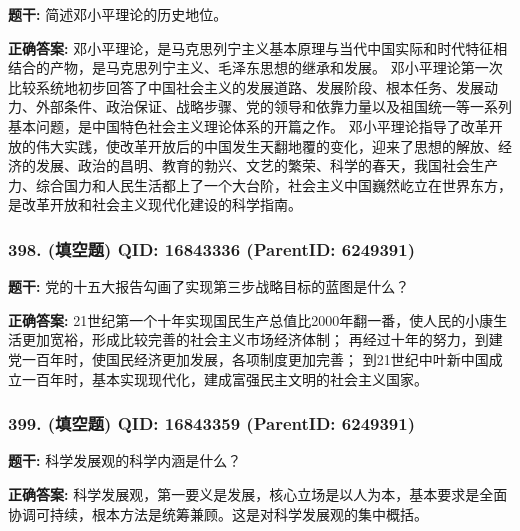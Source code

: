 \documentclass[12pt,UTF8]{ctexart}
\begin{document}
\textbf{题干:}
简述邓小平理论的历史地位。



\textbf{正确答案:}
邓小平理论，是马克思列宁主义基本原理与当代中国实际和时代特征相结合的产物，是马克思列宁主义、毛泽东思想的继承和发展。
邓小平理论第一次比较系统地初步回答了中国社会主义的发展道路、发展阶段、根本任务、发展动力、外部条件、政治保证、战略步骤、党的领导和依靠力量以及祖国统一等一系列基本问题，是中国特色社会主义理论体系的开篇之作。
邓小平理论指导了改革开放的伟大实践，使改革开放后的中国发生天翻地覆的变化，迎来了思想的解放、经济的发展、政治的昌明、教育的勃兴、文艺的繁荣、科学的春天，我国社会生产力、综合国力和人民生活都上了一个大台阶，社会主义中国巍然屹立在世界东方，是改革开放和社会主义现代化建设的科学指南。

\vspace{0.3em}\hrulefill\vspace{0.7em}

\subsubsection*{398. (填空题) \small QID: 16843336 (ParentID: 6249391)}

\textbf{题干:}
党的十五大报告勾画了实现第三步战略目标的蓝图是什么？



\textbf{正确答案:}
21世纪第一个十年实现国民生产总值比2000年翻一番，使人民的小康生活更加宽裕，形成比较完善的社会主义市场经济体制；
再经过十年的努力，到建党一百年时，使国民经济更加发展，各项制度更加完善；
到21世纪中叶新中国成立一百年时，基本实现现代化，建成富强民主文明的社会主义国家。

\vspace{0.3em}\hrulefill\vspace{0.7em}

\subsubsection*{399. (填空题) \small QID: 16843359 (ParentID: 6249391)}

\textbf{题干:}
科学发展观的科学内涵是什么？



\textbf{正确答案:}
科学发展观，第一要义是发展，核心立场是以人为本，基本要求是全面协调可持续，根本方法是统筹兼顾。这是对科学发展观的集中概括。

\vspace{0.3em}\hrulefill\vspace{0.7em}
\end{document}
